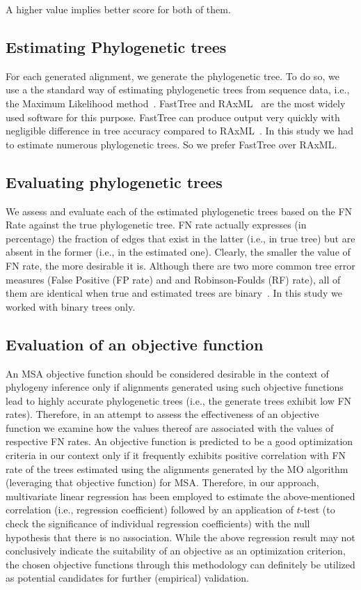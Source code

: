 A higher value implies better score for both of them.\subsection{Estimating Phylogenetic trees}
\label{sec:tree_estimation}
For each generated alignment, we generate the phylogenetic tree. To do so, we use a the standard way of estimating phylogenetic trees from sequence data, i.e., the Maximum Likelihood  method~\cite{liu2011raxml}. FastTree\citep{price2010fasttree} and RAxML~\citep{stamatakis2014raxml} are the most widely used software for this purpose. FastTree can produce output very quickly with negligible difference in tree accuracy compared to RAxML~\cite{liu2011raxml}. In this study we had to estimate numerous phylogenetic trees. So we prefer FastTree over RAxML.\subsection{Evaluating phylogenetic trees}
\label{sec:tree_eval}
We assess and evaluate each of the estimated phylogenetic trees based on the FN Rate against the true phylogenetic tree. 
FN rate actually expresses (in percentage) the fraction of edges that exist in the latter (i.e., in true tree) but are absent in the former (i.e., in the estimated one). Clearly, the smaller the value of FN rate, the more desirable it is. Although there are two more common tree error measures (False Positive (FP rate) and and Robinson-Foulds (RF) rate), all of them are identical when true and estimated trees are binary~\citep{warnow2017computational}. In this study we worked with binary trees only.\subsection{Evaluation of an objective function}
\label{sec:obj_eval}
An MSA objective function should be considered desirable in the context of phylogeny inference only if alignments generated using such objective functions lead to highly accurate phylogenetic trees (i.e., the generate trees exhibit low FN rates).     
Therefore, in an attempt to assess the effectiveness of an objective function we examine how the values thereof are associated with the values of respective FN rates. An objective function is predicted to be a good optimization criteria in our context only if it frequently exhibits positive correlation with FN rate of the trees estimated using the alignments generated by the MO algorithm (leveraging that objective function) for MSA.   
Therefore, in our approach, multivariate linear regression has been employed to estimate the above-mentioned correlation (i.e., regression coefficient) followed by an application of $t$-test (to check the significance of individual regression coefficients) with the null hypothesis that there is no association. While the above regression result may not conclusively indicate the suitability of an objective as an optimization criterion, the chosen objective functions through this methodology can definitely be utilized as potential candidates for further (empirical) validation.



